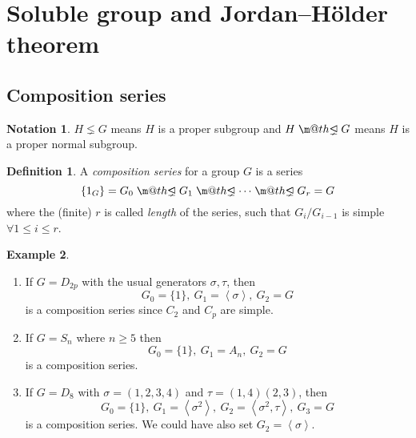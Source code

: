 \documentclass[a4paper]{article}
\makeatletter
\DeclareRobustCommand{\pns}{\mathrel{\text{$\m@th\proper@ideal$}}}
\newcommand{\proper@ideal}{%
  \ooalign{$\lneq$\cr\raise.22ex\hbox{$\lhd$}\cr}%
}
\newcommand{\la}{\left\langle}
\newcommand{\ra}{\right\rangle}
\theoremstyle{definition}
\newtheorem{defn}{Definition}[subsection]
\newtheorem{example}[defn]{Example}
\newtheorem*{notation}{Notation}
\makeatother
\begin{document}
\section{Soluble group and Jordan–Hölder theorem}
\subsection{Composition series}
\begin{notation}
$H\lneq G$ means $H$ is a proper subgroup and $H\pns G$ means $H$ is a proper normal subgroup.
\end{notation}
\begin{defn}
A \textit{composition series} for a group $G$ is a series
\[
\{1_G\}=G_0\pns G_1\pns\cdots\pns G_r=G
\]
where the (finite) $r$ is called \textit{length} of the series, such that $G_i/G_{i-1}$ is simple $\forall 1\leq i\leq r$.
\end{defn}
\begin{example}
\label{example:compositionseries}
\begin{enumerate}
\item If $G=D_{2p}$ with the usual generators $\sigma,\tau$, then
\[
G_0=\{1\},\ G_1=\la\sigma\ra,\ G_2=G
\]
is a composition series since $C_2$ and $C_p$ are simple.
\item If $G=S_n$ where $n\geq 5$ then
\[
G_0=\{1\},\ G_1=A_n,\ G_2=G\]
is a composition series.
\item If $G=D_8$ with $\sigma=(1,2,3,4)$ and $\tau=(1,4)(2,3)$, then
\[
G_0=\{1\},\ G_1=\la\sigma^2\ra,\ G_2=\la\sigma^2,\tau\ra,\ G_3=G
\]
is a composition series. We could have also set $G_2=\la\sigma\ra$.
\end{enumerate}
\end{example}
\end{document}
